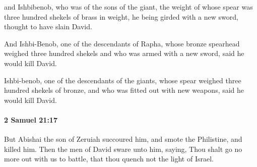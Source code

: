			\begin{versebox}
					\item[BHS] 
					\item[ASV] and Ishbibenob, who was of the sons of the giant, the weight of whose spear was three hundred shekels of brass in weight, he being girded with a new sword, thought to have slain David.
					\item[NIV] And Ishbi-Benob, one of the descendants of Rapha, whose bronze spearhead weighed three hundred shekels and who was armed with a new sword, said he would kill David.
					\item[NRSV] Ishbi-benob, one of the descendants of the giants, whose spear weighed three hundred shekels of bronze, and who was fitted out with new weapons, said he would kill David.
			\end{versebox}

		\paragraph{2 Samuel 21:17} %
			\label{2SAMUEL-21-17}

			But Abishai the son of Zeruiah succoured him, and smote the Philistine, and killed him. Then the men of David sware unto him, saying, Thou shalt go no more out with us to battle, that thou quench not the light of Israel.

